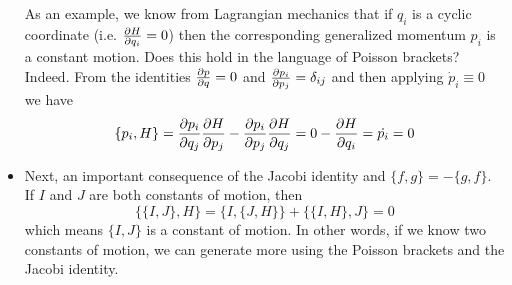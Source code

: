 \documentclass[11pt, a4paper]{article}
\begin{document}
\begin{itemize}
	As an example, we know from Lagrangian mechanics that if $ q_{i} $ is a cyclic coordinate (i.e. $ \pdv{H}{q_{i}} = 0 $) then the corresponding generalized momentum $ p_{i} $ is a constant motion. Does this hold in the language of Poisson brackets? Indeed. From the identities $ \pdv{p}{q} = 0 $ and $ \pdv{p_{i}}{p_{j}} = \delta_{i j} $ and then applying $ \dot{p}_{i} \equiv 0 $ we have
	\begin{equation*}
		\{p_{i}, H\} = \pdv{p_{i}}{q_{j}} \pdv{H}{p_{j}} - \pdv{p_{i}}{p_{j}}\pdv{H}{q_{j}} = 0 - \pdv{H}{q_{i}} = \dot{p_{i}} = 0
	\end{equation*}
	
	\item Next, an important consequence of the Jacobi identity and $ \{f, g\} = - \{g, f\} $. If $ I $ and $ J $ are both constants of motion, then
	\begin{equation*}
		\{\{I, J\}, H\} = \{I, \{J, H \}\} + \{\{I, H\}, J\} = 0
	\end{equation*}
	which means $ \{I, J\} $ is a constant of motion. In other words, if we know two constants of motion, we can generate more using the Poisson brackets and the Jacobi identity.
\end{itemize}
\end{document}

